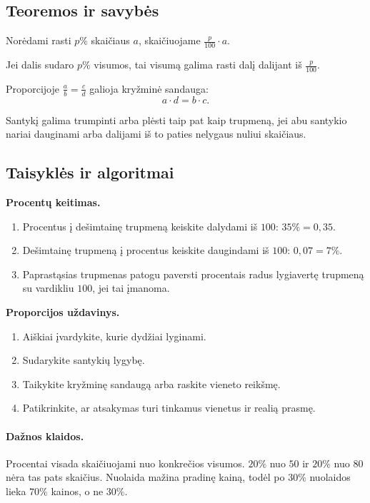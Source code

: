 \subsection{Teoremos ir savybės}
\begin{savybe}
Norėdami rasti \(p\%\) skaičiaus \(a\), skaičiuojame \(\frac{p}{100}\cdot a\).
\end{savybe}
\begin{savybe}
Jei dalis sudaro \(p\%\) visumos, tai visumą galima rasti dalį dalijant iš \(\frac{p}{100}\).
\end{savybe}
\begin{savybe}
Proporcijoje \(\frac{a}{b}=\frac{c}{d}\) galioja kryžminė sandauga:
\[
a\cdot d=b\cdot c.
\]
\end{savybe}
\begin{savybe}
Santykį galima trumpinti arba plėsti taip pat kaip trupmeną, jei abu santykio nariai dauginami arba dalijami iš to paties nelygaus nuliui skaičiaus.
\end{savybe}

\subsection{Taisyklės ir algoritmai}
\textbf{Procentų keitimas.}
\begin{enumerate}[label=\arabic*.]
\item Procentus į dešimtainę trupmeną keiskite dalydami iš \(100\): \(35\%=0,35\).
\item Dešimtainę trupmeną į procentus keiskite daugindami iš \(100\): \(0,07=7\%\).
\item Paprastąsias trupmenas patogu paversti procentais radus lygiavertę trupmeną su vardikliu \(100\), jei tai įmanoma.
\end{enumerate}

\textbf{Proporcijos uždavinys.}
\begin{enumerate}[label=\arabic*.]
\item Aiškiai įvardykite, kurie dydžiai lyginami.
\item Sudarykite santykių lygybę.
\item Taikykite kryžminę sandaugą arba raskite vieneto reikšmę.
\item Patikrinkite, ar atsakymas turi tinkamus vienetus ir realią prasmę.
\end{enumerate}

\paragraph{Dažnos klaidos.}
Procentai visada skaičiuojami nuo konkrečios visumos. \(20\%\) nuo \(50\) ir \(20\%\) nuo \(80\) nėra tas pats skaičius. Nuolaida mažina pradinę kainą, todėl po \(30\%\) nuolaidos lieka \(70\%\) kainos, o ne \(30\%\).

